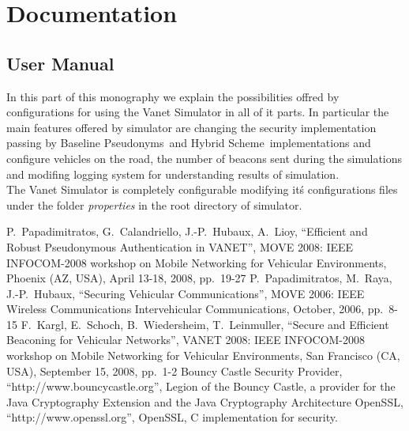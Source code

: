 \documentclass[a4paper,12pt]{article}
\def\baseline{Baseline Pseudonyms~}
\def\hybrid{Hybrid Scheme~}
\begin{document}
\section{Documentation}
\subsection{User Manual}
In this part of this monography we explain the possibilities offred by configurations for using the Vanet Simulator in all of it parts. In particular the main features offered by simulator are changing the security implementation passing by \baseline and \hybrid implementations and configure vehicles on the road, the number of beacons sent during the simulations and modifing logging system for understanding results of simulation.\\
The Vanet Simulator is completely configurable modifying it\'s configurations files under the folder \textit{properties} in the root directory of simulator.

\begin{thebibliography}{99}\label{bibliography}
%
%
P.~Papadimitratos, G.~Calandriello, J.-P.~Hubaux, A.~Lioy,
``Efficient and Robust Pseudonymous Authentication in VANET'',
MOVE 2008: IEEE INFOCOM-2008 workshop on Mobile Networking for Vehicular Environments,
Phoenix (AZ, USA), April 13-18, 2008, pp.~19-27 
P.~Papadimitratos, M.~Raya, J.-P.~Hubaux,
``Securing Vehicular Communications'',
MOVE 2006: IEEE Wireless Communications Intervehicular Communications,
October, 2006, pp.~8-15 
F.~Kargl, E.~Schoch, B.~Wiedersheim, T.~Leinmuller,
``Secure and Efficient Beaconing for Vehicular Networks'',
VANET 2008: IEEE INFOCOM-2008 workshop on Mobile Networking for Vehicular Environments,
San Francisco (CA, USA), September 15, 2008, pp.~1-2 
Bouncy Castle Security Provider,
``http://www.bouncycastle.org'',
Legion of the Bouncy Castle, a provider for the Java Cryptography Extension and the Java Cryptography Architecture
OpenSSL,
``http://www.openssl.org'',
OpenSSL, C implementation for security.
\end{thebibliography}
\end{document}
